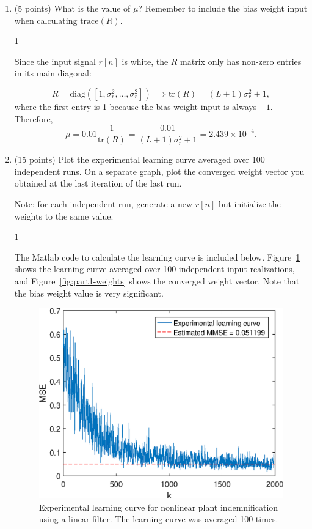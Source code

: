\documentclass[10pt]{article}
\def\SOLUTIONS{0} %
\def\SolutionsColor{red2}
\begin{document}
\begin{enumerate}[label=(\alph*)]
	\item (5 points) What is the value of $\mu$? Remember to include the bias weight input when calculating $\mathrm{trace}(R)$.
	
	\if\SOLUTIONS1 {\color{\SolutionsColor}
		Since the input signal $r[n]$ is white, the $R$ matrix only has non-zero entries in its main diagonal:
		
		\begin{equation}
		R = \mathrm{diag}([1, \sigma^2_r, \ldots, \sigma^2_r]) \implies \mathrm{tr}(R) = (L+1)\sigma^2_r + 1,
		\end{equation} 
		where the first entry is 1 because the bias weight input is always $+1$. Therefore,
		\begin{equation}
		\mu = 0.01\frac{1}{\mathrm{tr}(R)} = \frac{0.01}{(L+1)\sigma^2_r + 1} = 2.439\times 10^{-4}.
		\end{equation}
	}
	\fi
	
	\item (15 points) Plot the experimental learning curve averaged over 100 independent runs. On a separate graph, plot the converged weight vector you obtained at the last iteration of the last run.
	
	Note: for each independent run, generate a new $r[n]$ but initialize the weights to the same value.
	
	\if\SOLUTIONS1 {\color{\SolutionsColor}
		
		The Matlab code to calculate the learning curve is included below. Figure~\ref{fig:part1-learning-curve} shows the learning curve averaged over 100 independent input realizations, and  Figure~\ref{fig:part1-weights} shows the converged weight vector. Note that the bias weight value is very significant.
		
		\FloatBarrier
		\begin{figure}[h!]
			\centering
			\includegraphics[scale=0.8]{figs/part1_learning_curve.eps}
			\caption{Experimental learning curve for nonlinear plant indemnification using a linear filter. The learning curve was averaged 100 times.}
			\label{fig:part1-learning-curve}
		\end{figure}
		\FloatBarrier
		
}
\end{enumerate}
\end{document}
